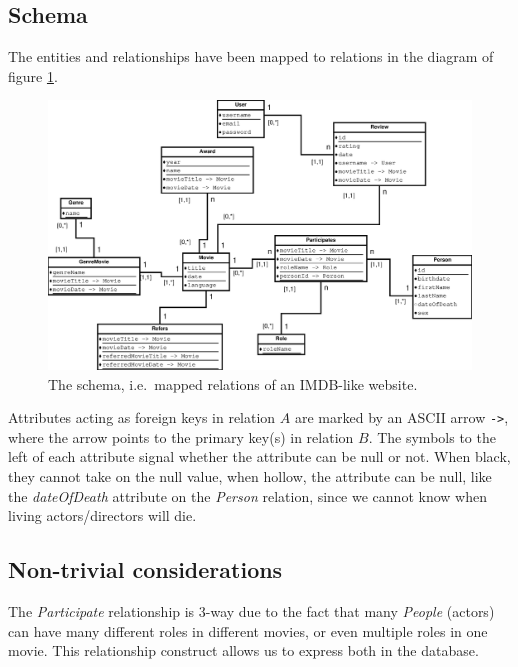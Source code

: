 \subsection{Schema}
The entities and relationships have been mapped to relations in the diagram of figure \ref{fig:ss2-schema}.
\begin{figure}[h]
  \centering
  \includegraphics[width=\linewidth]{2-17.02.14/DatabaseSchema.eps}
  \caption{The schema, i.e.\ mapped relations of an IMDB-like website.}\label{fig:ss2-schema}
\end{figure}
Attributes acting as foreign keys in relation $A$ are marked by an ASCII arrow \texttt{->}, where the arrow points to the primary key(s) in relation $B$. The symbols to the left of each attribute signal whether the attribute can be null or not. When black, they cannot take on the null value, when hollow, the attribute can be null, like the \emph{dateOfDeath} attribute on the \emph{Person} relation, since we cannot know when living actors/directors will die.

\subsection{Non-trivial considerations}
The \emph{Participate} relationship is 3-way due to the fact that many \emph{People} (actors) can have many different roles in different movies, or even multiple roles in one movie. This relationship construct allows us to express both in the database.


